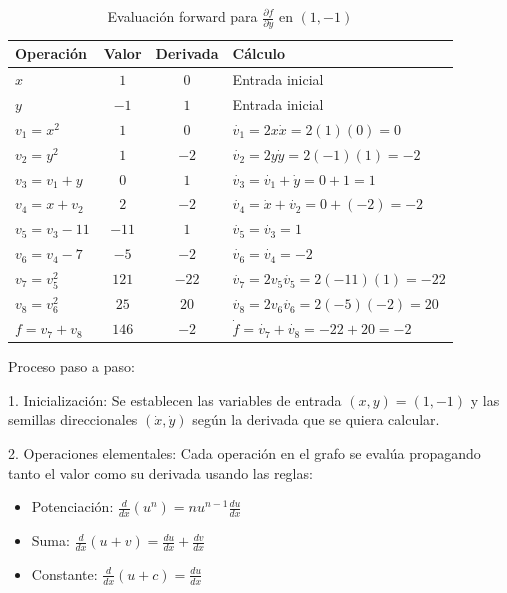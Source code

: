\documentclass{article}
\begin{document}
\begin{table}[h]
\centering
\begin{tabular}{|l|c|c|l|}
\hline
\textbf{Operación} & \textbf{Valor} & \textbf{Derivada} & \textbf{Cálculo} \\
\hline
$x$ & $1$ & $0$ & Entrada inicial \\
$y$ & $-1$ & $1$ & Entrada inicial \\
\hline
$v_1 = x^2$ & $1$ & $0$ & $\dot{v_1} = 2x\dot{x} = 2(1)(0) = 0$ \\
$v_2 = y^2$ & $1$ & $-2$ & $\dot{v_2} = 2y\dot{y} = 2(-1)(1) = -2$ \\
\hline
$v_3 = v_1 + y$ & $0$ & $1$ & $\dot{v_3} = \dot{v_1} + \dot{y} = 0 + 1 = 1$ \\
$v_4 = x + v_2$ & $2$ & $-2$ & $\dot{v_4} = \dot{x} + \dot{v_2} = 0 + (-2) = -2$ \\
\hline
$v_5 = v_3 - 11$ & $-11$ & $1$ & $\dot{v_5} = \dot{v_3} = 1$ \\
$v_6 = v_4 - 7$ & $-5$ & $-2$ & $\dot{v_6} = \dot{v_4} = -2$ \\
\hline
$v_7 = v_5^2$ & $121$ & $-22$ & $\dot{v_7} = 2v_5\dot{v_5} = 2(-11)(1) = -22$ \\
$v_8 = v_6^2$ & $25$ & $20$ & $\dot{v_8} = 2v_6\dot{v_6} = 2(-5)(-2) = 20$ \\
\hline
$f = v_7 + v_8$ & $146$ & $-2$ & $\dot{f} = \dot{v_7} + \dot{v_8} = -22 + 20 = -2$ \\
\hline
\end{tabular}
\caption{Evaluación forward para $\frac{\partial f}{\partial y}$ en $(1,-1)$}
\end{table}

Proceso paso a paso:

1. Inicialización: Se establecen las variables de entrada $(x,y) = (1,-1)$ y las semillas direccionales $(\dot{x}, \dot{y})$ según la derivada que se quiera calcular.

2. Operaciones elementales: Cada operación en el grafo se evalúa propagando tanto el valor como su derivada usando las reglas:
   \begin{itemize}
       \item Potenciación: $\frac{d}{dx}(u^n) = nu^{n-1}\frac{du}{dx}$
       \item Suma: $\frac{d}{dx}(u + v) = \frac{du}{dx} + \frac{dv}{dx}$
       \item Constante: $\frac{d}{dx}(u + c) = \frac{du}{dx}$
   \end{itemize}
\end{document}
